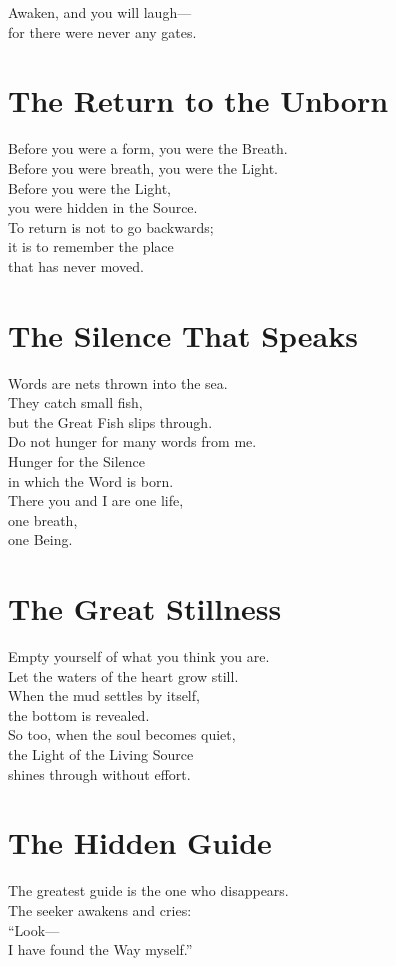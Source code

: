 \documentclass[10pt, openright]{book}
\begin{document}
Awaken, and you will laugh— \\
for there were never any gates.

\section{The Return to the Unborn}
Before you were a form, you were the Breath. \\
Before you were breath, you were the Light. \\
Before you were the Light, \\
you were hidden in the Source. \\

To return is not to go backwards; \\
it is to remember the place \\
that has never moved.

\section{The Silence That Speaks}
Words are nets thrown into the sea. \\
They catch small fish, \\
but the Great Fish slips through. \\

Do not hunger for many words from me. \\
Hunger for the Silence \\
in which the Word is born. \\
There you and I are one life, \\
one breath, \\
one Being.

\section{The Great Stillness}
Empty yourself of what you think you are. \\
Let the waters of the heart grow still. \\
When the mud settles by itself, \\
the bottom is revealed. \\

So too, when the soul becomes quiet, \\
the Light of the Living Source \\
shines through without effort.

\section{The Hidden Guide}
The greatest guide is the one who disappears. \\
The seeker awakens and cries: \\
``Look— \\
I have found the Way myself.'' \\
\end{document}

